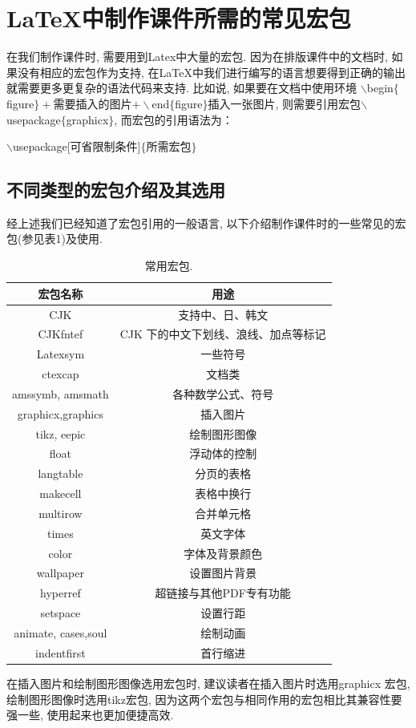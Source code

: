 \section{\LaTeX{}中制作课件所需的常见宏包}

在我们制作课件时, 需要用到Latex中大量的宏包. 因为在排版课件中的文档时, 如果没有相应的宏包作为支持, 在\LaTeX{}中我们进行编写的语言想要得到正确的输出就需要更多更复杂的语法代码来支持. 比如说, 如果要在文档中使用环境
$\backslash$begin$\{$figure$\}+$需要插入的图片$+\backslash$end$\{$figure$\}$插入一张图片, 则需要引用宏包$\backslash$usepackage$\{$graphicx$\}$, 而宏包的引用语法为：\\
\centerline{$\backslash$usepackage[可省限制条件]$\{$所需宏包$\}$}
\subsection{不同类型的宏包介绍及其选用}

经上述我们已经知道了宏包引用的一般语言, 以下介绍制作课件时的一些常见的宏包(参见表1)及使用.

\begin{table}[htb]
\centering{}\renewcommand{}
\caption{\label{tab2}常用宏包.}\medskip
\begin{tabular}{|c|c|}
  \hline
  宏包名称 & 用途 \\ \hline
  CJK      & 支持中、日、韩文 \\\hline
  CJKfntef & CJK 下的中文下划线、浪线、加点等标记 \\\hline
  Latexsym & 一些符号 \\\hline
  ctexcap  & 文档类 \\\hline
  amssymb, amsmath& 各种数学公式、符号 \\\hline
  graphicx,graphics & 插入图片 \\\hline
  tikz, eepic& 绘制图形图像 \\\hline
  float    & 浮动体的控制 \\\hline
  langtable& 分页的表格 \\\hline
  makecell & 表格中换行 \\\hline
  multirow & 合并单元格 \\\hline
  times & 英文字体 \\\hline
  color & 字体及背景颜色 \\\hline
  wallpaper& 设置图片背景\\\hline
  hyperref & 超链接与其他PDF专有功能 \\\hline
  setspace & 设置行距 \\\hline
  animate, cases,soul &绘制动画 \\\hline
  indentfirst & 首行缩进\\
  \hline
\end{tabular}\vspace*{-10pt}
\end{table}
在插入图片和绘制图形图像选用宏包时, 建议读者在插入图片时选用graphicx 宏包, 绘制图形图像时选用tikz宏包, 因为这两个宏包与相同作用的宏包相比其兼容性要强一些, 使用起来也更加便捷高效.

